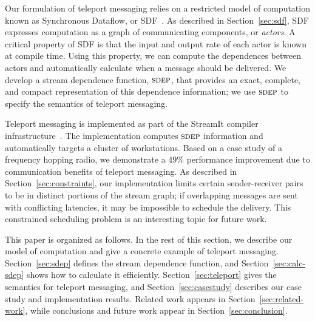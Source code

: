 Our formulation of teleport messaging relies on a restricted model of
computation known as Synchronous Dataflow, or SDF~\cite{LM87-i}.  As
described in Section~\ref{sec:sdf}, SDF expresses computation as a
graph of communicating components, or {\it actors}.  A critical
property of SDF is that the input and output rate of each actor is
known at compile time.  Using this property, we can compute the
dependences between actors and automatically calculate when a message
should be delivered.  We develop a stream dependence function,
$\textsc{sdep}$, that provides an exact, complete, and compact representation
of this dependence information; we use $\textsc{sdep}$ to specify the
semantics of teleport messaging.

Teleport messaging is implemented as part of the StreamIt compiler
infrastructure~\cite{streamitcc}.  The implementation computes $\textsc{sdep}$
information and automatically targets a cluster of workstations.
Based on a case study of a frequency hopping radio, we demonstrate a
49\% performance improvement due to communication benefits of teleport
messaging.  As described in Section~\ref{sec:constraints}, our
implementation limits certain sender-receiver pairs to be in distinct
portions of the stream graph; if overlapping messages are sent with
conflicting latencies, it may be impossible to schedule the delivery.
This constrained scheduling problem is an interesting topic for future
work.

This paper is organized as follows.  In the rest of this
section, we describe our model of computation and give a concrete
example of teleport messaging.  Section~\ref{sec:sdep} defines the
stream dependence function, and Section~\ref{sec:calc-sdep} shows how
to calculate it efficiently.  Section~\ref{sec:teleport} gives the
semantics for teleport messaging, and Section~\ref{sec:casestudy}
describes our case study and implementation results.  
Related work appears in Section~\ref{sec:related-work}, while
conclusions and future work appear in Section~\ref{sec:conclusion}.


